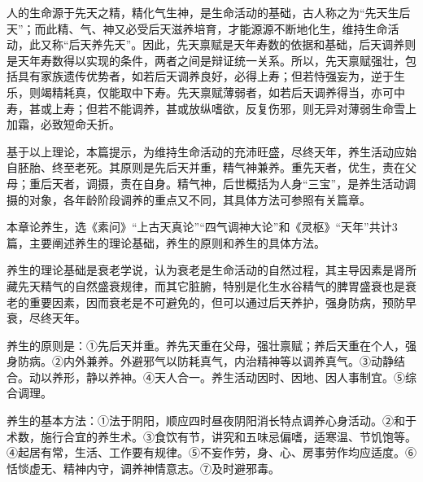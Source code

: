 \documentclass[draft,12pt]{ctexbook}
\begin{document}
人的生命源于先天之精，精化气生神，是生命活动的基础，古人称之为“先天生后天”；而此精、气、神又必受后天滋养培育，才能源源不断地化生，维持生命活动，此又称“后天养先天”。因此，先天禀赋是天年寿数的依据和基础，后天调养则是天年寿数得以实现的条件，两者之间是辩证统一关系。所以，先天禀赋强壮，包括具有家族遗传优势者，如若后天调养良好，必得上寿；但若恃强妄为，逆于生乐，则竭精耗真，仅能取中下寿。先天禀赋薄弱者，如若后天调养得当，亦可中寿，甚或上寿；但若不能调养，甚或放纵嗜欲，反复伤邪，则无异对薄弱生命雪上加霜，必致短命夭折。

基于以上理论，本篇提示，为维持生命活动的充沛旺盛，尽终天年，养生活动应始自胚胎、终至老死。其原则是先后天并重，精气神兼养。重先天者，优生，责在父母；重后天者，调摄，责在自身。精气神，后世概括为人身“三宝”，是养生活动调摄的对象，各年龄阶段调养的重点又不同，其具体方法可参照有关篇章。

\xiaojie

本章论养生，选《素问》“上古天真论”“四气调神大论”和《灵枢》“天年”共计3篇，主要阐述养生的理论基础，养生的原则和养生的具体方法。

养生的理论基础是衰老学说，认为衰老是生命活动的自然过程，其主导因素是肾所藏先天精气的自然盛衰规律，而其它脏腑，特别是化生水谷精气的脾胃盛衰也是衰老的重要因素，因而衰老是不可避免的，但可以通过后天养护，强身防病，预防早衰，尽终天年。

养生的原则是：①先后天并重。养先天重在父母，强壮禀赋；养后天重在个人，强身防病。②内外兼养。外避邪气以防耗真气，内治精神等以调养真气。③动静结合。动以养形，静以养神。④天人合一。养生活动因时、因地、因人事制宜。⑤综合调理。

养生的基本方法：①法于阴阳，顺应四时昼夜阴阳消长特点调养心身活动。②和于术数，施行合宜的养生术。③食饮有节，讲究和五味忌偏嗜，适寒温、节饥饱等。④起居有常，生活、工作要有规律。⑤不妄作劳，身、心、房事劳作均应适度。⑥恬惔虚无、精神内守，调养神情意志。⑦及时避邪毒。

\ifx \allfiles \undefined
\end{document}
